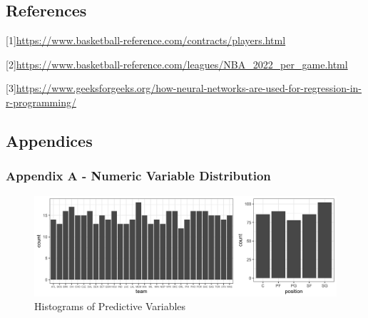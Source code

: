 \documentclass[
]{article}
\begin{document}
\newpage

\hypertarget{references}{%
\subsection{References}\label{references}}

{[}1{]}\url{https://www.basketball-reference.com/contracts/players.html}

{[}2{]}\url{https://www.basketball-reference.com/leagues/NBA_2022_per_game.html}

{[}3{]}\url{https://www.geeksforgeeks.org/how-neural-networks-are-used-for-regression-in-r-programming/}

\newpage

\hypertarget{appendices}{%
\subsection{Appendices}\label{appendices}}

\hypertarget{appendix-a---numeric-variable-distribution}{%
\subsubsection{Appendix A - Numeric Variable
Distribution}\label{appendix-a---numeric-variable-distribution}}

\begin{figure}
\centering
\includegraphics{report_figures/figure_1.png}
\caption{Histograms of Predictive Variables}
\end{figure}
\end{document}
